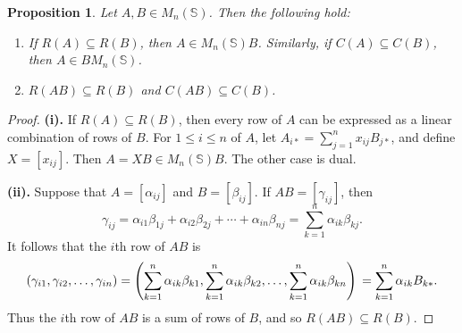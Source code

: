 \documentclass[11pt]{article}
\newtheorem{prop}[thm]{Proposition}
\numberwithin{equation}{section}
\begin{document}
\begin{prop}
  Let $A, B \in M_n(\mathbb{S})$. Then the following hold:
  \begin{enumerate}[label=\roman*]

    \item
      If $R(A) \subseteq R(B)$, then $A \in M_n(\mathbb{S}) B$.  Similarly, if $C(A)
      \subseteq C(B)$, then $A \in B M_n(\mathbb{S})$.

    \item 
      $R(AB) \subseteq R(B)$ and $C(AB) \subseteq C(B)$.
  \end{enumerate}
\end{prop}
\begin{proof}
  \noindent \textbf{(i).}
  If $R(A) \subseteq R(B)$, then every row of $A$ can be expressed as a linear
  combination of rows of $B$. For $1 \leq i \leq n$ of $A$, let $A_{i*} =
  \sum_{j = 1}^{n}x_{ij}B_{j*}$, and define $X = [x_{ij}]$. Then $A = XB \in
  M_n(\mathbb{S})B$. The other case is dual.
  \bigskip

  \noindent \textbf{(ii).}
  Suppose that $A = [\alpha_{ij}]$ and $B = [\beta_{ij}]$. If 
  $AB = [\gamma_{ij}]$, then 
  \[
  \gamma_{ij} = \alpha_{i1} \beta_{1j} + \alpha_{i2}\beta_{2j} 
                + \cdots + \alpha_{in}\beta_{nj}
              = \sum_{k = 1} ^ {n} \alpha_{ik}\beta_{kj}.
  \]
  It follows that the $i$th row of $AB$ is 
  \[
  (\gamma_{i1}, \gamma_{i2}, \ldots, \gamma_{in})
   =  \left (\sum_{k = 1} ^ {n} \alpha_{ik}\beta_{k1},
     \sum_{k = 1} ^ {n} \alpha_{ik}\beta_{k2},
     \ldots, 
     \sum_{k = 1} ^ {n} \alpha_{ik}\beta_{kn}\right) \\
    =
    \sum_{k = 1} ^ {n} 
    \alpha_{ik}B_{k*}.
  \]
  Thus the $i$th row of $AB$ is a sum of rows of $B$, and so $R(AB) \subseteq
  R(B)$. 
\end{proof}
\end{document}
